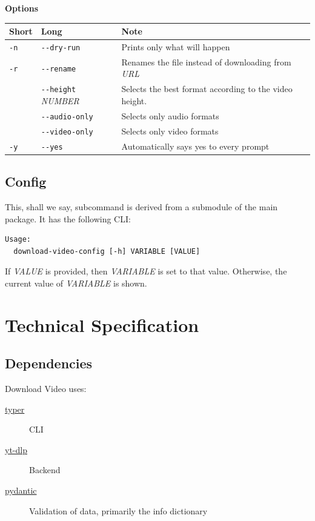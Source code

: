 \documentclass[11pt]{report}
\begin{document}
\textbf{Options}

\begin{center}
\begin{tabular}{lll}
Short & Long & Note\\
\hline
\texttt{-n} & \texttt{-{}-dry-run} & Prints only what will happen\\
\texttt{-r} & \texttt{-{}-rename} & Renames the file instead of downloading from \emph{URL}\\
 & \texttt{-{}-height} \emph{NUMBER} & Selects the best format according to the video height.\\
 & \texttt{-{}-audio-only} & Selects only audio formats\\
 & \texttt{-{}-video-only} & Selects only video formats\\
\texttt{-y} & \texttt{-{}-yes} & Automatically says yes to every prompt\\
\end{tabular}
\end{center}

\chapter{Config}
\label{sec:org160a58f}

This, shall we say, subcommand is derived from a submodule of the main package.
It has the following CLI:

\begin{verbatim}
Usage:
  download-video-config [-h] VARIABLE [VALUE]
\end{verbatim}

If \emph{VALUE} is provided, then \emph{VARIABLE} is set to that value.  Otherwise, the
current value of \emph{VARIABLE} is shown.

\part{Technical Specification}
\label{sec:org1850ec9}

\chapter{Dependencies}
\label{sec:orgbfeddb5}

Download Video uses:
\begin{description}
\item[{\href{https://pypi.org/project/typer}{typer}}] CLI
\item[{\href{https://pypi.org/project/yt-dlp}{yt-dlp}}] Backend
\item[{\href{https://pypi.org/project/pydantic}{pydantic}}] Validation of data, primarily the info dictionary
\end{description}
\end{document}
